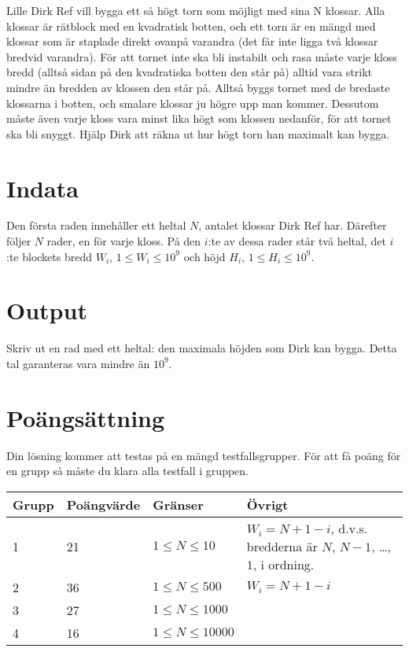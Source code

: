 Lille Dirk Ref vill bygga ett så högt torn som möjligt med sina N klossar. Alla klossar är rätblock med en kvadratisk botten, och ett torn är en mängd med klossar som är staplade direkt ovanpå varandra (det får inte ligga två klossar bredvid varandra). För att tornet inte ska bli instabilt och rasa måste varje kloss bredd (alltså sidan på den kvadratiska botten den står på) alltid vara strikt mindre än bredden av klossen den står på. Alltså byggs tornet med de bredaste klossarna i botten, och smalare klossar ju högre upp man kommer. Dessutom måste även varje kloss vara minst lika högt som klossen nedanför, för att tornet ska bli snyggt. Hjälp Dirk att räkna ut hur högt torn han maximalt kan bygga.

\section*{Indata}
Den första raden innehåller ett heltal $N$, antalet klossar Dirk Ref har. Därefter följer $N$ rader, en för varje kloss. På den $i$:te av dessa rader står två heltal, det $i$:te blockets bredd $W_i$, $1 \leq W_i \leq 10^9$ och höjd $H_i$, $1 \leq H_i \leq 10^9$.

\section*{Output}
Skriv ut en rad med ett heltal: den maximala höjden som Dirk kan bygga. Detta tal garanteras vara mindre än $10^9$.

\section*{Poängsättning}
Din lösning kommer att testas på en mängd testfallsgrupper. För att få poäng för en grupp så måste du klara alla testfall i gruppen.

\begin{tabular}{|l|l|l|l|}
\hline
Grupp & Poängvärde & Gränser & Övrigt \\ \hline
1     & 21         & $1 \leq N \leq 10$ & $W_i = N+1 - i$, d.v.s. bredderna är $N$, $N-1$, \dots, $1$, i ordning. \\ \hline
2     & 36         & $1 \leq N \leq 500$ & $W_i = N+1 - i$ \\ \hline
3     & 27         & $1 \leq N \leq 1000$ & \\ \hline
4     & 16         & $1 \leq N \leq 10000$ & \\ \hline
\end{tabular}
